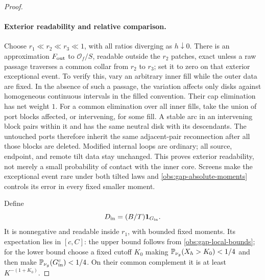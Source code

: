 \begin{proof}
\paragraph{Exterior readability and relative comparison.}
Choose $r_1\ll r_2\ll r_3\ll1$, with all ratios diverging as
$h\downarrow0$.  There is an approximation $F_{\rm out}$ to
$\mathcal O_f/S$, readable outside the $r_2$ patches, exact
unless a raw passage traverses a common collar from $r_2$ to
$r_3$; set it to zero on that exterior exceptional event.  To
verify this, vary an arbitrary inner fill while the outer data
are fixed.  In the absence of such a passage, the variation
affects only disks against homogeneous continuous intervals in
the filled convention.  Their cap elimination has net weight
$1$.  For a common elimination over all inner fills, take the
union of port blocks affected, or intervening, for some fill.
A stable arc in an intervening block pairs within it and has
the same neutral disk with its descendants.  The untouched
ports therefore inherit the same adjacent-pair reconnection
after all those blocks are deleted.  Modified internal loops
are ordinary; all source, endpoint, and remote tilt data stay
unchanged.  This proves exterior readability, not merely a
small probability of contact with the inner core.  Screens
make the exceptional event rare under both tilted laws and
\eqref{obs:gap-absolute-moments} controls its error in every
fixed smaller moment.

Define
\[
 D_{\rm in}=(B/T)\mathbf 1_{G_{\rm in}}.
\]
It is nonnegative and readable inside $r_1$, with bounded fixed
moments.  Its expectation lies in $[c,C]$: the upper bound follows
from \eqref{obs:gap-local-bounds}; for the lower bound choose
a fixed cutoff $K_0$ making $\mathbb P_{\nu_g}(X_h>K_0)<1/4$ and
then make $\mathbb P_{\nu_g}(G_{\rm in}^c)<1/4$.  On their common
complement it is at least $K^{-(1+K_0)}$.


\end{proof}
